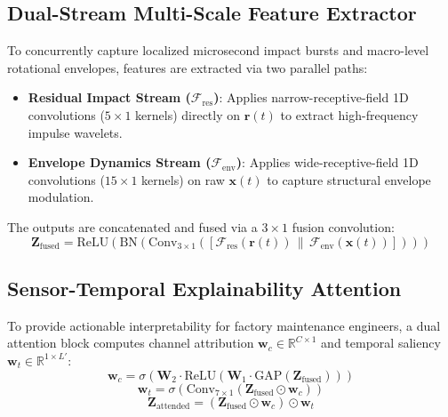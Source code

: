 ﻿\documentclass[journal,10pt,twocolumn]{IEEEtran}
\begin{document}
\subsection{Dual-Stream Multi-Scale Feature Extractor}
To concurrently capture localized microsecond impact bursts and macro-level rotational envelopes, features are extracted via two parallel paths:
\begin{itemize}
    \item \textbf{Residual Impact Stream ($\mathcal{F}_{\text{res}}$)}: Applies narrow-receptive-field 1D convolutions ($5 \times 1$ kernels) directly on $\mathbf{r}(t)$ to extract high-frequency impulse wavelets.
    \item \textbf{Envelope Dynamics Stream ($\mathcal{F}_{\text{env}}$)}: Applies wide-receptive-field 1D convolutions ($15 \times 1$ kernels) on raw $\mathbf{x}(t)$ to capture structural envelope modulation.
\end{itemize}
The outputs are concatenated and fused via a $3 \times 1$ fusion convolution:
\begin{equation}
    \mathbf{Z}_{\text{fused}} = \text{ReLU}\left( \text{BN}\left( \text{Conv}_{3\times1}\left( [\mathcal{F}_{\text{res}}(\mathbf{r}(t)) \,\|\, \mathcal{F}_{\text{env}}(\mathbf{x}(t))] \right) \right) \right)
\end{equation}

\subsection{Sensor-Temporal Explainability Attention}
To provide actionable interpretability for factory maintenance engineers, a dual attention block computes channel attribution $\mathbf{w}_c \in \mathbb{R}^{C \times 1}$ and temporal saliency $\mathbf{w}_t \in \mathbb{R}^{1 \times L'}$:
\begin{equation}
    \mathbf{w}_c = \sigma\left( \mathbf{W}_2 \cdot \text{ReLU}\left( \mathbf{W}_1 \cdot \text{GAP}(\mathbf{Z}_{\text{fused}}) \right) \right)
\end{equation}
\begin{equation}
    \mathbf{w}_t = \sigma\left( \text{Conv}_{7\times1}\left( \mathbf{Z}_{\text{fused}} \odot \mathbf{w}_c \right) \right)
\end{equation}
\begin{equation}
    \mathbf{Z}_{\text{attended}} = (\mathbf{Z}_{\text{fused}} \odot \mathbf{w}_c) \odot \mathbf{w}_t
\end{equation}
\end{document}
